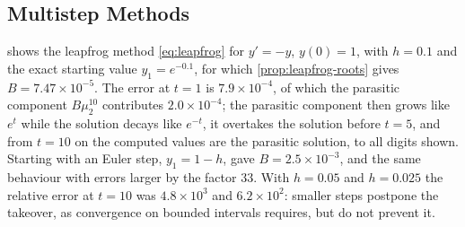 \subsection{Multistep Methods}

 shows the leapfrog method \eqref{eq:leapfrog} for $y'=-y$, $y(0)=1$, with $h=0.1$ and the exact starting value $y_1=e^{-0.1}$, for which \cref{prop:leapfrog-roots} gives $B=7.47\times10^{-5}$. The error at $t=1$ is $7.9\times10^{-4}$, of which the parasitic component $B\mu_2^{10}$ contributes $2.0\times10^{-4}$; the parasitic component then grows like $e^{t}$ while the solution decays like $e^{-t}$, it overtakes the solution before $t=5$, and from $t=10$ on the computed values are the parasitic solution, to all digits shown. Starting with an Euler step, $y_1=1-h$, gave $B=2.5\times10^{-3}$, and the same behaviour with errors larger by the factor $33$. With $h=0.05$ and $h=0.025$ the relative error at $t=10$ was $4.8\times10^3$ and $6.2\times10^2$: smaller steps postpone the takeover, as convergence on bounded intervals requires, but do not prevent it.

\begin{table}
\end{table}

